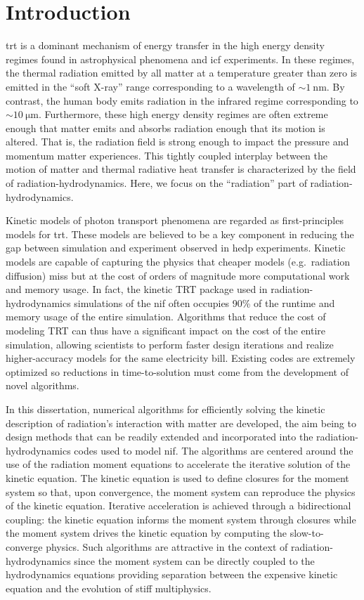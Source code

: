 \documentclass[../doc.tex]{subfiles}
\begin{document}
\chapter{Introduction}
\Gls{trt} is a dominant mechanism of energy transfer in the high energy density regimes found in astrophysical phenomena and \gls{icf} experiments. In these regimes, the thermal radiation emitted by all matter at a temperature greater than zero is emitted in the ``soft X-ray'' range corresponding to a wavelength of $\sim\!\SI{1}{\nano\meter}$. By contrast, the human body emits radiation in the infrared regime corresponding to $\sim\!\SI{10}{\micro\meter}$. 
Furthermore, these high energy density regimes are often extreme enough that matter emits and absorbs radiation enough that its motion is altered. 
That is, the radiation field is strong enough to impact the pressure and momentum matter experiences. This tightly coupled interplay between the motion of matter and thermal radiative heat transfer is characterized by the field of radiation-hydrodynamics. Here, we focus on the ``radiation'' part of radiation-hydrodynamics. 

Kinetic models of photon transport phenomena are regarded as first-principles models for \gls{trt}. These models are believed to be a key component in reducing the gap between simulation and experiment observed in \gls{hedp} experiments. 
Kinetic models are capable of capturing the physics that cheaper models (e.g.~radiation diffusion) miss but at the cost of orders of magnitude more computational work and memory usage. 
In fact, the kinetic TRT package used in radiation-hydrodynamics simulations of the \gls{nif} often occupies 90\% of the runtime and memory usage of the entire simulation. Algorithms that reduce the cost of modeling TRT can thus have a significant impact on the cost of the entire simulation, allowing scientists to perform faster design iterations and realize higher-accuracy models for the same electricity bill. 
Existing codes are extremely optimized so reductions in time-to-solution must come from the development of novel algorithms. 

In this dissertation, numerical algorithms for efficiently solving the kinetic description of radiation's interaction with matter are developed, the aim being to design methods that can be readily extended and incorporated into the radiation-hydrodynamics codes used to model \gls{nif}. The algorithms are centered around the use of the radiation moment equations to accelerate the iterative solution of the kinetic equation. The kinetic equation is used to define closures for the moment system so that, upon convergence, the moment system can reproduce the physics of the kinetic equation. 
Iterative acceleration is achieved through a bidirectional coupling: the kinetic equation informs the moment system through closures while the moment system drives the kinetic equation by computing the slow-to-converge physics. Such algorithms are attractive in the context of radiation-hydrodynamics since the moment system can be directly coupled to the hydrodynamics equations providing separation between the expensive kinetic equation and the evolution of stiff multiphysics. 
\end{document}
